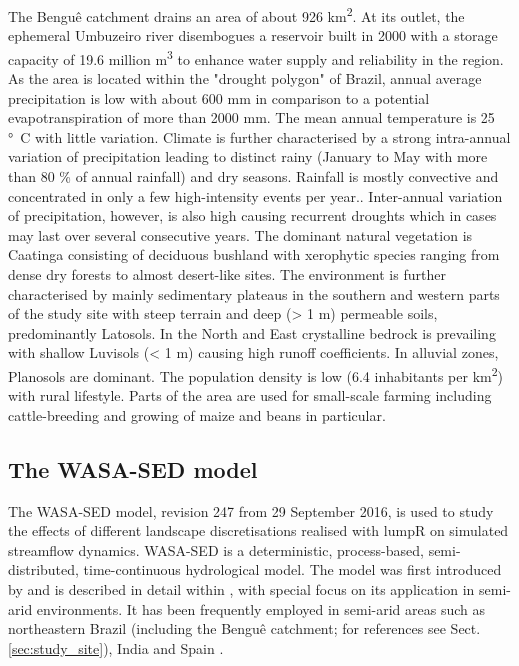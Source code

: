 The Bengu\^e catchment drains an area of about 926 \unit{km^2}.
At its outlet, the ephemeral Umbuzeiro river disembogues a reservoir built in 2000 with a storage capacity of 19.6 million \unit{m^3} to enhance water supply and reliability in the region.
As the area is located within the "drought polygon" of Brazil, annual average precipitation is low with about 600 \unit{mm} in comparison to a potential evapotranspiration of more than 2000 \unit{mm}.
The mean annual temperature is 25 \unit{\degree C} with little variation.
Climate is further characterised by a strong intra-annual variation of precipitation leading to distinct rainy (January to May with more than 80 \% of annual rainfall) and dry seasons.
Rainfall is mostly convective and concentrated in only a few high-intensity events per year..
Inter-annual variation of precipitation, however, is also high causing recurrent droughts which in cases may last over several consecutive years.
The dominant natural vegetation is Caatinga consisting of deciduous bushland with xerophytic species ranging from dense dry forests to almost desert-like sites.
The environment is further characterised by mainly sedimentary plateaus in the southern and western parts of the study site with steep terrain and deep (> 1 m) permeable soils, predominantly Latosols.
In the North and East crystalline bedrock is prevailing with shallow Luvisols (< 1 m) causing high runoff coefficients.
In alluvial zones, Planosols are dominant.
The population density is low (6.4 inhabitants per \unit{km^2}) with rural lifestyle.
Parts of the area are used for small-scale farming including cattle-breeding and growing of maize and beans in particular.


\subsection{The WASA-SED model}
\label{sec:wasa}
The WASA-SED model, revision 247 from 29 September 2016, is used to study the effects of different landscape discretisations realised with lumpR on simulated streamflow dynamics.
WASA-SED is a deterministic, process-based, semi-distributed, time-continuous hydrological model.
The model was first introduced by and is described in detail within \citet{Guentner2002}, with special focus on its application in semi-arid environments.
It has been frequently employed in semi-arid areas such as northeastern Brazil (including the Bengu\^e catchment; for references see Sect.\DIFaddbegin \DIFadd{\ }\DIFaddend \ref{sec:study_site}), India \citep{Jackisch2014} and Spain \citep{Mueller2009,Mueller2010,Bronstert2014}.

